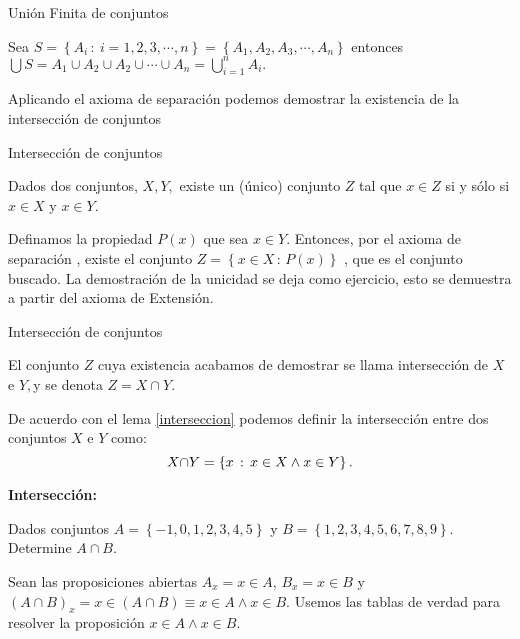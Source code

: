 \begin{defi}{Unión Finita de conjuntos}{}

Sea $S=\left\{ A_{i}\,:\:i=1,2,3,\cdots,n\right\} =\left\{ A_{1},A_{2},A_{3},\cdots,A_{n}\right\} $
entonces $\bigcup S=A_{1}\cup A_{2}\cup A_{2}\cup\cdots\cup A_{n}={\displaystyle \bigcup_{i=1}^{n}A_{i}}.$

\end{defi}

Aplicando el axioma de separación podemos demostrar la existencia
de la intersección de conjuntos

\begin{lema}{Intersección de conjuntos}{}\label{interseccion}

Dados dos conjuntos, $X,Y,$ existe un (único) conjunto $Z$ tal que
$x\in Z$ si y sólo si $x\in X$ y $x\in Y.$

\end{lema}

\begin{prueba} 

Definamos la propiedad $P\left(x\right)$ que sea $x\in Y.$ Entonces,
por el axioma de separación , existe el conjunto $Z=\left\{ x\in X\,:\,P\left(x\right)\right\} $
, que es el conjunto buscado. La demostración de la unicidad se deja
como ejercicio, esto se demuestra a partir del axioma de Extensión.

\end{prueba}

\begin{defi}{Intersecci\'on de conjuntos}{}\label{inter}

El conjunto $Z$ cuya existencia acabamos de demostrar se llama intersección
de $X$ e $Y,$y se denota $Z=X\cap Y.$

De acuerdo con el lema \ref{interseccion} podemos definir la intersección
entre dos conjuntos $X$ e $Y$ como: 
\[
\mbox{\ensuremath{X}\ensuremath{\cap}\ensuremath{Y=\ensuremath{\left\{ x\,:\,x\in X\wedge x\in Y\right\} }.}}
\]

\end{defi}

\begin{ejemplo}{\bf Intersección:}

Dados conjuntos $A=\left\{ -1,0,1,2,3,4,5\right\} $ y $B=\left\{ 1,2,3,4,5,6,7,8,9\right\} .$
Determine $A\cap B.$ 

\end{ejemplo}

\solu Sean las proposiciones abiertas $A_{x}=x\in A$, $B_{x}=x\in B$
y $\left(A\cap B\right)_{x}=x\in\left(A\cap B\right)\equiv x\in A\wedge x\in B.$
Usemos las tablas de verdad para resolver la proposición $x\in A\wedge x\in B.$

